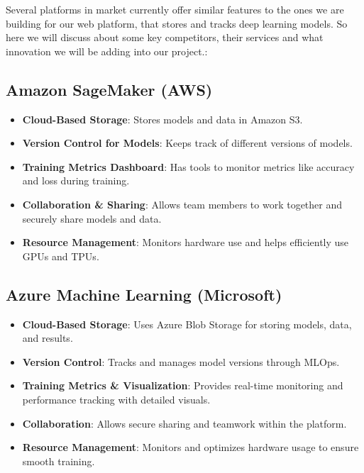 \documentclass[12pt]{article}
\begin{document}
\maketitle

Several platforms in market currently offer similar features to the ones we are building for our web platform, that stores and tracks deep learning models. So here we will discuss about some key competitors, their services and what innovation we will be adding into our project.:

\subsection{Amazon SageMaker (AWS)}
\begin{itemize}
    \item \textbf{Cloud-Based Storage}: Stores models and data in Amazon S3.
    \item \textbf{Version Control for Models}: Keeps track of different versions of models.
    \item \textbf{Training Metrics Dashboard}: Has tools to monitor metrics like accuracy and loss during training.
    \item \textbf{Collaboration \& Sharing}: Allows team members to work together and securely share models and data.
    \item \textbf{Resource Management}: Monitors hardware use and helps efficiently use GPUs and TPUs.
\cite{aws_sagemaker}

\end{itemize}

\subsection*{Azure Machine Learning (Microsoft)}
\begin{itemize}
    \item \textbf{Cloud-Based Storage}: Uses Azure Blob Storage for storing models, data, and results.
    \item \textbf{Version Control}: Tracks and manages model versions through MLOps.
    \item \textbf{Training Metrics \& Visualization}: Provides real-time monitoring and performance tracking with detailed visuals.
    \item \textbf{Collaboration}: Allows secure sharing and teamwork within the platform.
    \item \textbf{Resource Management}: Monitors and optimizes hardware usage to ensure smooth training.
\cite{azume_ml}

\end{itemize}
\end{document}
